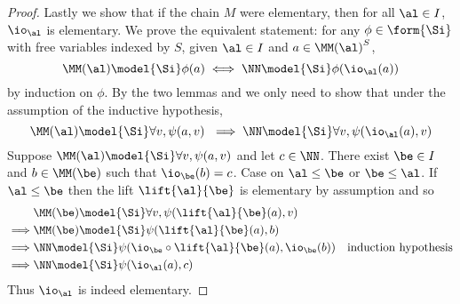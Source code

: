 \begin{proof}
    Lastly we show that if the chain $M$ were elementary, 
    then for all $\al \in I$, $\io_\al$ is elementary.
    We prove the equivalent statement:
    for any $\phi \in \form{\Si}$ with free variables indexed by $S$, 
    given $\al \in I$ and $a \in {\MM(\al)}^S$,
    \[\MM(\al) \model{\Si} \phi(a) \iff \NN \model{\Si} \phi(\io_\al (a))\]
    by induction on $\phi$.
    By the two lemmas  and 
    we only need to show that under the assumption of the inductive hypothesis,
    \[\MM(\al) \model{\Si} \forall v, \psi(a,v) \
    \implies \NN \model{\Si} \forall v, \psi(\io_\al (a),v)\]
    Suppose $\MM(\al) \model{\Si} \forall v, \psi(a,v)$
    and let $c \in {\NN}$.
    There exist $\be \in I$ and $b \in {\MM(\be)}$ such that 
    $\io_\be(b) = c$.
    Case on $\al \leq \be$ or $\be \leq \al$.
    If $\al \leq \be$ then the lift $\lift{\al}{\be}$ is elementary by assumption
    and so 
    \begin{align*}
            & \MM(\be) \model{\Si} \forall v, \psi(\lift{\al}{\be}(a),v)\\
        \implies & \MM(\be) \model{\Si} \psi(\lift{\al}{\be}(a),b)\\
        \implies & \NN \model{\Si} \psi(\io_\be \circ \lift{\al}{\be}(a),\io_\be (b))
                & \text{induction hypothesis}\\
        \implies &  \NN \model{\Si} \psi(\io_\al (a),c)
    \end{align*}
    Thus $\io_\al$ is indeed elementary.
\end{proof}